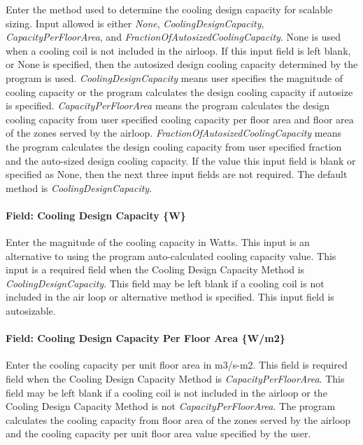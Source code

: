 Enter the method used to determine the cooling design capacity for scalable sizing. Input allowed is either \emph{None}, \emph{CoolingDesignCapacity}, \emph{CapacityPerFloorArea}, and \emph{FractionOfAutosizedCoolingCapacity}. None is used when a cooling coil is not included in the airloop. If this input field is left blank, or None is specified, then the autosized design cooling capacity determined by the program is used. \emph{CoolingDesignCapacity} means user specifies the magnitude of cooling capacity or the program calculates the design cooling capacity if autosize is specified. \emph{CapacityPerFloorArea} means the program calculates the design cooling capacity from user specified cooling capacity per floor area and floor area of the zones served by the airloop. \emph{FractionOfAutosizedCoolingCapacity} means the program calculates the design cooling capacity from user specified fraction and the auto-sized design cooling capacity. If the value this input field is blank or specified as None, then the next three input fields are not required. The default method is \emph{CoolingDesignCapacity}.

\paragraph{Field: Cooling Design Capacity \{W\}}\label{field-cooling-design-capacity-w-1}

Enter the magnitude of the cooling capacity in Watts. This input is an alternative to using the program auto-calculated cooling capacity value. This input is a required field when the Cooling Design Capacity Method is \emph{CoolingDesignCapacity}. This field may be left blank if a cooling coil is not included in the air loop or alternative method is specified. This input field is autosizable.

\paragraph{Field: Cooling Design Capacity Per Floor Area \{W/m2\}}\label{field-cooling-design-capacity-per-floor-area-wm2-1}

Enter the cooling capacity per unit floor area in m3/s-m2. This field is required field when the Cooling Design Capacity Method is \emph{CapacityPerFloorArea}. This field may be left blank if a cooling coil is not included in the airloop or the Cooling Design Capacity Method is not \emph{CapacityPerFloorArea}. The program calculates the cooling capacity from floor area of the zones served by the airloop and the cooling capacity per unit floor area value specified by the user.

